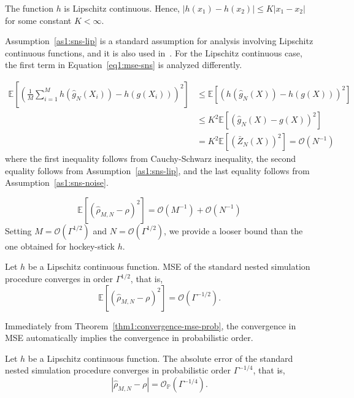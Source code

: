 \begin{assumption} \label{as1:sns-lip}
    The function $h$ is Lipschitz continuous. Hence, $|h(x_1) - h(x_2)| \leq K|x_1 - x_2|$ for some constant $K< \infty$.
\end{assumption}
Assumption~\ref{as1:sns-lip} is a standard assumption for analysis involving Lipschitz continuous functions, and it is also used in~\cite{broadie2015risk}.
For the Lipschitz continuous case, the first term in Equation~\ref{eq1:mse-sns} is analyzed differently.

\begin{align}
    \mathbb{E} \left[  \left( \frac{1}{M} \sum_{i=1}^M h\left( \hat{g}_{N}(X_i) \right) -  h\left(g(X_i) \right)  \right)^2\right]    
    & \leq \mathbb{E} \left[ \left( h\left( \hat{g}_{N}(X) \right) -  h\left(g(X) \right)  \right)^2\right]  \nonumber \\
    & \leq K^2 \mathbb{E} \left[ \left( \hat{g}_{N}(X) -  g(X)  \right)^2\right] \nonumber \\
    & = K^2 \mathbb{E} \left[ \left( \bar{Z}_{N}(X) \right)^2\right] = \mathcal{O}(N^{-1})
\end{align}
where the first inequality follows from Cauchy-Schwarz inequality, the second equality follows from Assumption~\ref{as1:sns-lip}, and the last equality follows from Assumption~\ref{as1:sns-noise}.

\begin{equation}
    \mathbb{E} \left[ \left( \hat{\rho}_{M, N} - \rho \right)^2 \right] = \mathcal{O}(M^{-1}) + \mathcal{O}(N^{-1})
\end{equation}
Setting $M = \mathcal{O}(\Gamma^{1/2})$ and $N = \mathcal{O}(\Gamma^{1/2})$, we provide a looser bound than the one obtained for hockey-stick $h$.

\begin{theorem}
    Let $h$ be a Lipschitz continuous function. 
    MSE of the standard nested simulation procedure converges in order $\Gamma^{1/2}$, that is,
    $$\mathbb{E} \left[ \left( \hat{\rho}_{M, N} - \rho \right)^2 \right] = \mathcal{O}(\Gamma^{-1/2}).$$
\end{theorem}

Immediately from Theorem~\ref{thm1:convergence-mse-prob}, the convergence in MSE automatically implies the convergence in probabilistic order.

\begin{corollary}
    Let $h$ be a Lipschitz continuous function. The absolute error of the standard nested simulation procedure converges in probabilistic order $\Gamma^{-1/4}$, that is,
    $$\left| \hat{\rho}_{M, N} - \rho \right| = \mathcal{O}_\mathbb{P}(\Gamma^{-1/4}).$$
\end{corollary}


